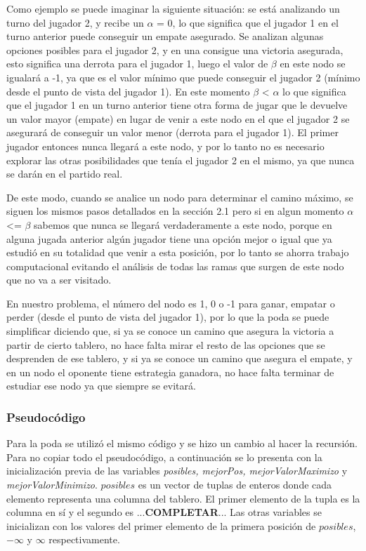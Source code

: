 \documentclass[A4paper,oneside,fleqn,11pt]{article}
\theoremstyle{definition}
\begin{document}
Como ejemplo se puede imaginar la siguiente situación: se está analizando un turno del jugador 2, y recibe un $\alpha$ = 0, lo que significa que el jugador 1 en el turno anterior puede conseguir un empate asegurado. Se analizan algunas opciones posibles para el jugador 2, y en una consigue una victoria asegurada, esto significa una derrota para el jugador 1, luego el valor de $\beta$ en este nodo se igualará a -1, ya que es el valor mínimo que puede conseguir el jugador 2 (mínimo desde el punto de vista del jugador 1). En este momento $\beta$ < $\alpha$ lo que significa que el jugador 1 en un turno anterior tiene otra forma de jugar que le devuelve un valor mayor (empate) en lugar de venir a este nodo en el que el jugador 2 se asegurará de conseguir un valor menor (derrota para el jugador 1). El primer jugador entonces nunca llegará a este nodo, y por lo tanto no es necesario explorar las otras posibilidades que tenía el jugador 2 en el mismo, ya que nunca se darán en el partido real.

De este modo, cuando se analice un nodo para determinar el camino máximo, se siguen los mismos pasos detallados en la sección 2.1 pero si en algun momento $\alpha$ <= $\beta$ sabemos que nunca se llegará verdaderamente a este nodo, porque en alguna jugada anterior algún jugador tiene una opción mejor o igual que ya estudió en su totalidad que venir a esta posición, por lo tanto se ahorra trabajo computacional evitando el análisis de todas las ramas que surgen de este nodo que no va a ser visitado.

En nuestro problema, el número del nodo es 1, 0 o -1 para ganar, empatar o perder (desde el punto de vista del jugador 1), por lo que la poda se puede simplificar diciendo que, si ya se conoce un camino que asegura la victoria a partir de cierto tablero, no hace falta mirar el resto de las opciones que se desprenden de ese tablero, y si ya se conoce un camino que asegura el empate, y en un nodo el oponente tiene estrategia ganadora, no hace falta terminar de estudiar ese nodo ya que siempre se evitará.



\subsubsection{Pseudocódigo}
Para la poda se utilizó el mismo código y se hizo un cambio al hacer la recursión. Para no copiar todo el pseudocódigo, a continuación se lo presenta con la inicialización previa de las variables \textit{posibles, mejorPos, mejorValorMaximizo} y \textit{mejorValorMinimizo}. $posibles$ es un vector de tuplas de enteros donde cada elemento representa una columna del tablero. El primer elemento de la tupla es la columna en sí y el segundo es ...\textbf{COMPLETAR}... Las otras variables se inicializan con los valores del primer elemento de la primera posición de $posibles$, $-\infty$ y $\infty$ respectivamente.
\end{document}
